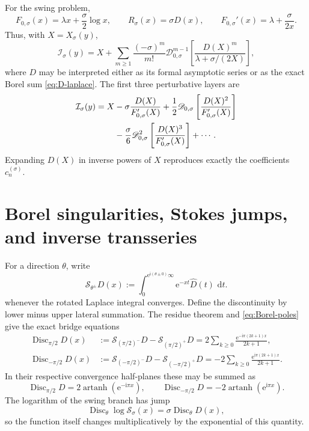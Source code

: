 \documentclass[11pt,a4paper]{article}
\numberwithin{equation}{section}
\theoremstyle{definition}
\theoremstyle{remark}
\newcommand{\e}{\mathrm e}
\newcommand{\dd}{\,\mathrm d}
\newcommand{\ii}{\mathrm i}
\newcommand{\Disc}{\operatorname{Disc}}
\begin{document}
For the swing problem,
\begin{equation}\label{eq:swing-F0-R}
 F_{0,\sigma}(x)=\lambda x+\frac\sigma2\log x,
 \qquad R_\sigma(x)=\sigma D(x),
 \qquad F_{0,\sigma}'(x)=\lambda+\frac\sigma{2x}.
\end{equation}
Thus, with \(X=X_\sigma(y)\),
\begin{equation}\label{eq:swing-operator-series}
 \mathcal I_\sigma(y)
 =X+\sum_{m\ge1}\frac{(-\sigma)^m}{m!}
 \mathscr D_{0,\sigma}^{m-1}
 \left[\frac{D(X)^m}{\lambda+\sigma/(2X)}\right],
\end{equation}
where \(D\) may be interpreted either as its formal asymptotic series or as
the exact Borel sum \cref{eq:D-laplace}.  The first three perturbative layers
are
\begin{align}
 \mathcal I_\sigma(y)=X
 &-\sigma\frac{D(X)}{F_{0,\sigma}'(X)}
 +\frac12\mathscr D_{0,\sigma}
   \left[\frac{D(X)^2}{F_{0,\sigma}'(X)}\right]\notag\\
 &-\frac\sigma6\mathscr D_{0,\sigma}^2
   \left[\frac{D(X)^3}{F_{0,\sigma}'(X)}\right]+\cdots.
 \label{eq:swing-operator-first}
\end{align}
Expanding \(D(X)\) in inverse powers of \(X\) reproduces exactly the
coefficients \(c_n^{(\sigma)}\).

\section{Borel singularities, Stokes jumps, and inverse transseries}
\label{sec:stokes}

For a direction \(\theta\), write
\begin{equation}\label{eq:lateral-sums}
 \mathcal S_{\theta^\pm}D(x)
 :=\int_{0}^{\e^{\ii(\theta\pm0)}\infty}
   \e^{-xt}\widehat D(t)\,\dd t.
\end{equation}
whenever the rotated Laplace integral converges.  Define the discontinuity
by lower minus upper lateral summation.  The residue theorem and
\cref{eq:Borel-poles} give the exact bridge equations
\begin{align}
 \Disc_{\pi/2}D(x)
 &:=\mathcal S_{(\pi/2)^-}D-
     \mathcal S_{(\pi/2)^+}D
 =2\sum_{k\ge0}\frac{\e^{-\ii\pi(2k+1)x}}{2k+1},
 \label{eq:upper-Stokes}\\
 \Disc_{-\pi/2}D(x)
 &:=\mathcal S_{(-\pi/2)^-}D-
     \mathcal S_{(-\pi/2)^+}D
 =-2\sum_{k\ge0}\frac{\e^{\ii\pi(2k+1)x}}{2k+1}.
 \label{eq:lower-Stokes}
\end{align}
In their respective convergence half-planes these may be summed as
\begin{equation}\label{eq:Stokes-artanh}
 \Disc_{\pi/2}D=2\operatorname{artanh}(\e^{-\ii\pi x}),
 \qquad
 \Disc_{-\pi/2}D=-2\operatorname{artanh}(\e^{\ii\pi x}).
\end{equation}
The logarithm of the swing branch has jump
\begin{equation}\label{eq:logS-jump}
 \Disc_\theta\log\mathcal S_\sigma(x)
 =\sigma\Disc_\theta D(x),
\end{equation}
so the function itself changes multiplicatively by the exponential of this
quantity.
\end{document}
